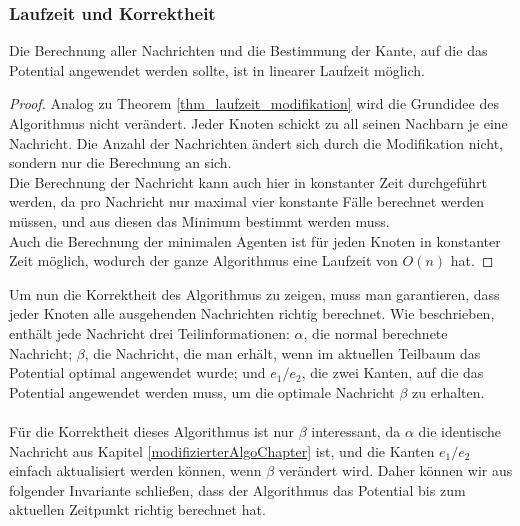 	
	\subsubsection{Laufzeit und Korrektheit}
	
	\begin{theorem}
		Die Berechnung aller Nachrichten und die Bestimmung der Kante, auf die das Potential angewendet werden sollte, ist in linearer Laufzeit möglich.
	\end{theorem}
	\begin{proof}
		Analog zu Theorem \ref{thm_laufzeit_modifikation} wird die Grundidee des Algorithmus nicht verändert. Jeder Knoten schickt zu all seinen Nachbarn je eine Nachricht. Die Anzahl der Nachrichten ändert sich durch die Modifikation nicht, sondern nur die Berechnung an sich.\\Die Berechnung der Nachricht kann auch hier in konstanter Zeit durchgeführt werden, da pro Nachricht nur maximal vier konstante Fälle berechnet werden müssen, und aus diesen das Minimum bestimmt werden muss.\\
		Auch die Berechnung der minimalen Agenten ist für jeden Knoten in konstanter Zeit möglich, wodurch der ganze Algorithmus eine Laufzeit von $O(n)$ hat.
	\end{proof}
	
	
	Um nun die Korrektheit des Algorithmus zu zeigen, muss man garantieren, dass jeder Knoten alle ausgehenden Nachrichten richtig berechnet. Wie beschrieben, enthält jede Nachricht drei Teilinformationen: $\alpha$, die normal berechnete Nachricht; $\beta$, die Nachricht, die man erhält, wenn im aktuellen Teilbaum das Potential optimal angewendet wurde; und $e_1/e_2$, die zwei Kanten, auf die das Potential angewendet werden muss, um die optimale Nachricht $\beta$ zu erhalten.
	\\
	\\
	Für die Korrektheit dieses Algorithmus ist nur $\beta$ interessant, da $\alpha$ die identische Nachricht aus Kapitel \ref{modifizierterAlgoChapter} ist, und die Kanten $e_1/e_2$ einfach aktualisiert werden können, wenn $\beta$ verändert wird. Daher können wir aus folgender Invariante schließen, dass der Algorithmus das Potential bis zum aktuellen Zeitpunkt richtig berechnet hat.
	
